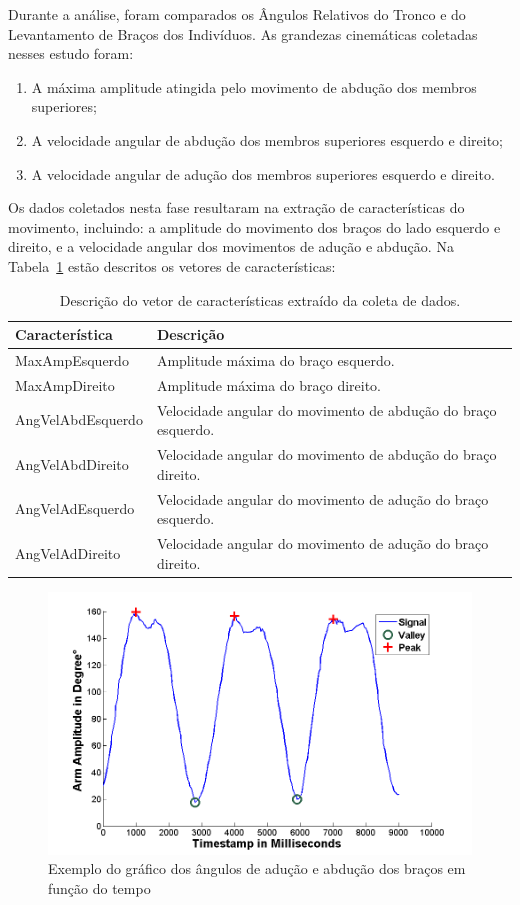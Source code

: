Durante a análise, foram comparados os Ângulos Relativos do Tronco e do Levantamento de Braços dos Indivíduos. As grandezas cinemáticas coletadas nesses estudo foram:
\begin{enumerate}
	\item A máxima amplitude atingida pelo movimento de abdução dos membros superiores;
	\item A velocidade angular de abdução dos membros superiores esquerdo e direito;
	\item A velocidade angular de adução dos membros superiores esquerdo e direito.
\end{enumerate}

Os dados coletados nesta fase resultaram na extração de características do movimento, incluindo: a amplitude do movimento dos braços do lado esquerdo e direito, e a velocidade angular dos movimentos de adução e abdução. Na Tabela~\ref{table:features} estão descritos os vetores de características:
\begin{table}[h]
\centering
\caption{Descrição do vetor de características extraído da coleta de dados.}
\label{table:features}
\begin{tabular}{|l|l|}
\hline
{\bf Característica}  & {\bf Descrição}                                       \\ \hline
MaxAmpEsquerdo     & Amplitude máxima do braço esquerdo. \\ \hline
MaxAmpDireito    & Amplitude máxima do braço direito. \\ \hline
AngVelAbdEsquerdo  & Velocidade angular do movimento de abdução do braço esquerdo. \\ \hline
AngVelAbdDireito & Velocidade angular do movimento de abdução do braço direito. \\ \hline
AngVelAdEsquerdo  & Velocidade angular do movimento de adução do braço esquerdo. \\ \hline
AngVelAdDireito & Velocidade angular do movimento de adução do braço direito. \\ \hline
\end{tabular}
\end{table}

\begin{figure}[!htb]
	\centering
	\includegraphics[width=1\textwidth]{img/signalamplitudepeakvaley-2.png}
	\caption{Exemplo do gráfico dos ângulos de adução e abdução dos braços em função do tempo}
	\label{fig:signalamplitudepeakvaley}
\end{figure}

